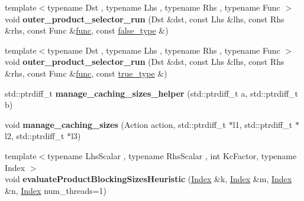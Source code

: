 \begin{DoxyCompactItemize}
\item 
\mbox{\label{namespace_eigen_1_1internal_a8490e8a32b5c5741c7872c2b2d5e6506}} 
{\footnotesize template$<$typename Dst , typename Lhs , typename Rhs , typename Func $>$ }\\void {\bfseries outer\+\_\+product\+\_\+selector\+\_\+run} (Dst \&dst, const Lhs \&lhs, const Rhs \&rhs, const Func \&\hyperlink{structfunc}{func}, const \hyperlink{struct_eigen_1_1internal_1_1false__type}{false\+\_\+type} \&)
\item 
\mbox{\label{namespace_eigen_1_1internal_ae52e47855a57586063f015d7a6e3179e}} 
{\footnotesize template$<$typename Dst , typename Lhs , typename Rhs , typename Func $>$ }\\void {\bfseries outer\+\_\+product\+\_\+selector\+\_\+run} (Dst \&dst, const Lhs \&lhs, const Rhs \&rhs, const Func \&\hyperlink{structfunc}{func}, const \hyperlink{struct_eigen_1_1internal_1_1true__type}{true\+\_\+type} \&)
\item 
\mbox{\label{namespace_eigen_1_1internal_ac2dabbb388a11b5e16876fccd70920f9}} 
std\+::ptrdiff\+\_\+t {\bfseries manage\+\_\+caching\+\_\+sizes\+\_\+helper} (std\+::ptrdiff\+\_\+t a, std\+::ptrdiff\+\_\+t b)
\item 
\mbox{\label{namespace_eigen_1_1internal_aa32f9fb4cd20f86ef87d00db101e2f7c}} 
void {\bfseries manage\+\_\+caching\+\_\+sizes} (Action action, std\+::ptrdiff\+\_\+t $\ast$l1, std\+::ptrdiff\+\_\+t $\ast$l2, std\+::ptrdiff\+\_\+t $\ast$l3)
\item 
\mbox{\label{namespace_eigen_1_1internal_a419aa7e2be7215d78da06bb9c0034fb9}} 
{\footnotesize template$<$typename Lhs\+Scalar , typename Rhs\+Scalar , int Kc\+Factor, typename Index $>$ }\\void {\bfseries evaluate\+Product\+Blocking\+Sizes\+Heuristic} (\hyperlink{namespace_eigen_a62e77e0933482dafde8fe197d9a2cfde}{Index} \&k, \hyperlink{namespace_eigen_a62e77e0933482dafde8fe197d9a2cfde}{Index} \&m, \hyperlink{namespace_eigen_a62e77e0933482dafde8fe197d9a2cfde}{Index} \&n, \hyperlink{namespace_eigen_a62e77e0933482dafde8fe197d9a2cfde}{Index} num\+\_\+threads=1)
\item 
\mbox{\label{namespace_eigen_1_1internal_ab9050235b243bc5110901e702ec6b8d9}} 

\end{DoxyCompactItemize}
